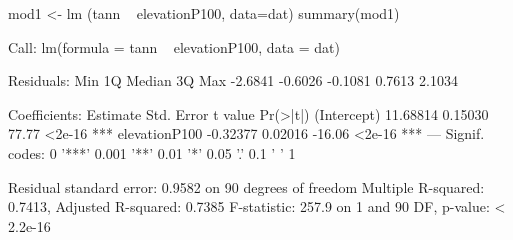 \begin{Schunk}
\begin{Sinput}
 mod1 <- lm (tann ~ elevationP100, data=dat)
 summary(mod1)
\end{Sinput}
\begin{Soutput}
Call:
lm(formula = tann ~ elevationP100, data = dat)

Residuals:
    Min      1Q  Median      3Q     Max 
-2.6841 -0.6026 -0.1081  0.7613  2.1034 

Coefficients:
              Estimate Std. Error t value Pr(>|t|)    
(Intercept)   11.68814    0.15030   77.77   <2e-16 ***
elevationP100 -0.32377    0.02016  -16.06   <2e-16 ***
---
Signif. codes:  0 '***' 0.001 '**' 0.01 '*' 0.05 '.' 0.1 ' ' 1

Residual standard error: 0.9582 on 90 degrees of freedom
Multiple R-squared:  0.7413,	Adjusted R-squared:  0.7385 
F-statistic: 257.9 on 1 and 90 DF,  p-value: < 2.2e-16
\end{Soutput}
\end{Schunk}

